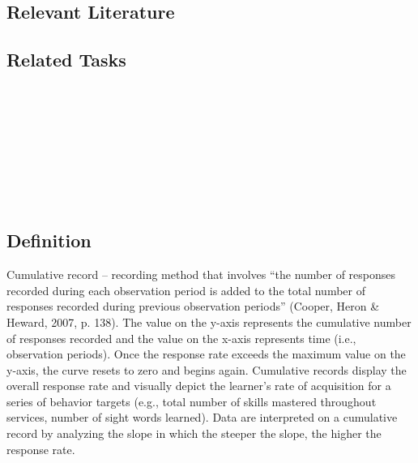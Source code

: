 \subsection{Relevant Literature}
\begin{refsection}
\nocite{test,alang2017police,clayton2018black}
\printbibliography[heading=none]
\end{refsection}
%
\subsection{Related Tasks}
\fourhOne{}\\
\fourhTwo{}\\
\fourhThree{}\\
\fourhFour{}\\
\fourhFive{}\\
\fourFKFourtySeven{}\\
\fourjFifteen{}\\
%
%
%
%
%
\section[\fouraEleven{}]{\fouraEleven{}%
              }
\subsection{Definition}
Cumulative record – recording method that involves ``the number of responses recorded during each observation period is added to the total number of responses recorded during previous observation periods'' (Cooper, Heron \& Heward, 2007, p. 138). The value on the y-axis represents the cumulative number of responses recorded and the value on the x-axis represents time (i.e., observation periods).  Once the response rate exceeds the maximum value on the y-axis, the curve resets to zero and begins again.  Cumulative records display the overall response rate and visually depict the learner's rate of acquisition for a series of behavior targets (e.g., total number of skills mastered throughout services, number of sight words learned).  Data are interpreted on a cumulative record by analyzing the slope in which the steeper the slope, the higher the response rate.
%
